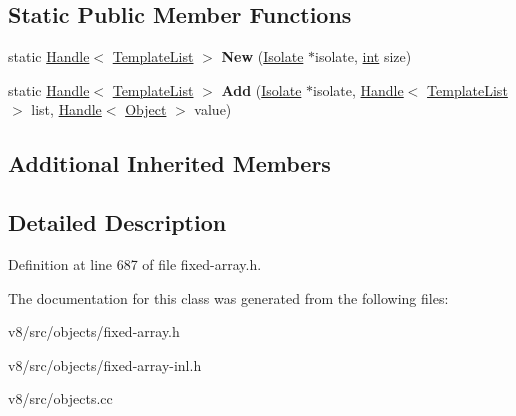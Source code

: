 \subsection*{Static Public Member Functions}
\begin{DoxyCompactItemize}
\item 
\mbox{\label{classv8_1_1internal_1_1TemplateList_ad75d6416037e11e324ac00759fb42fee}} 
static \mbox{\hyperlink{classv8_1_1internal_1_1Handle}{Handle}}$<$ \mbox{\hyperlink{classv8_1_1internal_1_1TemplateList}{Template\+List}} $>$ {\bfseries New} (\mbox{\hyperlink{classv8_1_1internal_1_1Isolate}{Isolate}} $\ast$isolate, \mbox{\hyperlink{classint}{int}} size)
\item 
\mbox{\label{classv8_1_1internal_1_1TemplateList_a60e1dd3ce1bb6f4838c0d911303d6700}} 
static \mbox{\hyperlink{classv8_1_1internal_1_1Handle}{Handle}}$<$ \mbox{\hyperlink{classv8_1_1internal_1_1TemplateList}{Template\+List}} $>$ {\bfseries Add} (\mbox{\hyperlink{classv8_1_1internal_1_1Isolate}{Isolate}} $\ast$isolate, \mbox{\hyperlink{classv8_1_1internal_1_1Handle}{Handle}}$<$ \mbox{\hyperlink{classv8_1_1internal_1_1TemplateList}{Template\+List}} $>$ list, \mbox{\hyperlink{classv8_1_1internal_1_1Handle}{Handle}}$<$ \mbox{\hyperlink{classv8_1_1internal_1_1Object}{Object}} $>$ value)
\end{DoxyCompactItemize}
\subsection*{Additional Inherited Members}


\subsection{Detailed Description}


Definition at line 687 of file fixed-\/array.\+h.



The documentation for this class was generated from the following files\+:\begin{DoxyCompactItemize}
\item 
v8/src/objects/fixed-\/array.\+h\item 
v8/src/objects/fixed-\/array-\/inl.\+h\item 
v8/src/objects.\+cc\end{DoxyCompactItemize}
